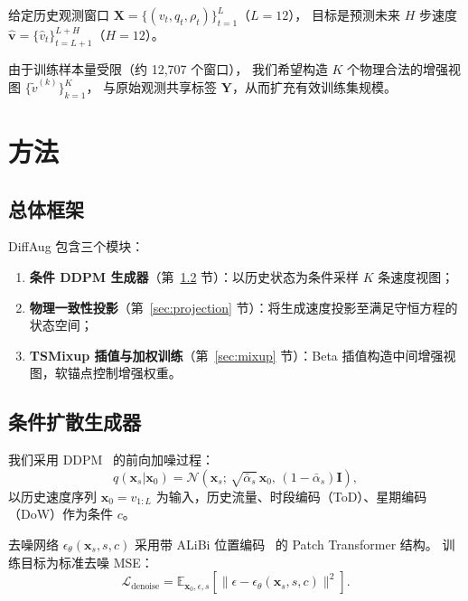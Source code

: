 \documentclass[12pt]{article}
\begin{document}
给定历史观测窗口 $\mathbf{X} = \{(v_t, q_t, \rho_t)\}_{t=1}^{L}$（$L=12$），
目标是预测未来 $H$ 步速度 $\hat{\mathbf{v}} = \{\hat{v}_t\}_{t=L+1}^{L+H}$（$H=12$）。

由于训练样本量受限（约 12,707 个窗口），
我们希望构造 $K$ 个物理合法的增强视图 $\{\tilde{v}^{(k)}\}_{k=1}^K$，
与原始观测共享标签 $\mathbf{Y}$，从而扩充有效训练集规模。

\section{方法}
\label{sec:method}

\subsection{总体框架}

DiffAug 包含三个模块：
\begin{enumerate}
  \item \textbf{条件 DDPM 生成器}（第~\ref{sec:ddpm} 节）：以历史状态为条件采样 $K$ 条速度视图；
  \item \textbf{物理一致性投影}（第~\ref{sec:projection} 节）：将生成速度投影至满足守恒方程的状态空间；
  \item \textbf{TSMixup 插值与加权训练}（第~\ref{sec:mixup} 节）：Beta 插值构造中间增强视图，软锚点控制增强权重。
\end{enumerate}

\subsection{条件扩散生成器}
\label{sec:ddpm}

我们采用 DDPM~\cite{ddpm} 的前向加噪过程：
\begin{equation}
  q(\mathbf{x}_s | \mathbf{x}_0) = \mathcal{N}(\mathbf{x}_s;\, \sqrt{\bar{\alpha}_s}\,\mathbf{x}_0,\, (1-\bar{\alpha}_s)\mathbf{I}),
\end{equation}
以历史速度序列 $\mathbf{x}_0 = v_{1:L}$ 为输入，历史流量、时段编码（ToD）、星期编码（DoW）作为条件 $c$。

去噪网络 $\epsilon_\theta(\mathbf{x}_s, s, c)$ 采用带 ALiBi 位置编码~\cite{alibi} 的 Patch Transformer 结构。
训练目标为标准去噪 MSE：
\begin{equation}
  \mathcal{L}_{\text{denoise}} = \mathbb{E}_{\mathbf{x}_0, \epsilon, s}\left[\|\epsilon - \epsilon_\theta(\mathbf{x}_s, s, c)\|^2\right].
\end{equation}
\end{document}
